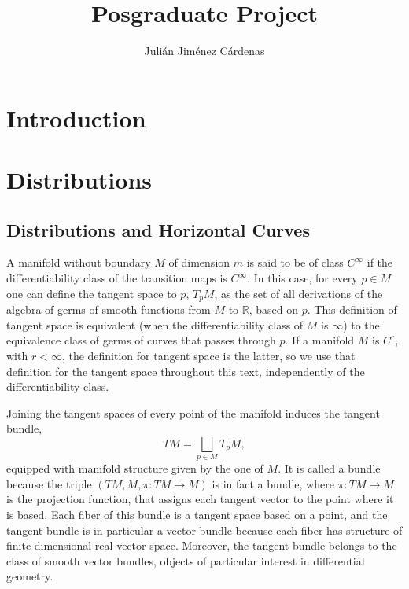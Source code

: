 \documentclass[12pt, letterpaper, reqno]{amsart}
\author{Julián Jiménez Cárdenas}
\title[Posgraduate Project]{Posgraduate Project}
\theoremstyle{definition}
\theoremstyle{plain}
\theoremstyle{remark}
\begin{document}
\maketitle
\begin{abstract}
\end{abstract}

\section*{Introduction}
\label{sec:0}


\section{Distributions}
\label{sec:1}

\subsection{Distributions and Horizontal Curves}%
\label{sub:distributions}


A manifold without boundary $M$ of dimension $ m $  is said to be of class $ C^\infty $ if the differentiability class of the transition maps is $C^\infty.$ In this case, for every $ p\in M $ one can define the tangent space to $ p $, $ T_pM $, as the set of all derivations of the algebra of germs of smooth functions from $ M $ to $ \mathbb{R}  $,  based on $ p $. This definition of tangent space is equivalent (when the differentiability class of $ M $ is $ \infty $) to the equivalence class of germs of curves that passes through $ p $. If a manifold $ M $  is $C^r$, with $r< \infty$, the definition for tangent space is the latter, so we use that definition for the tangent space throughout this text, independently of the differentiability class.

Joining the tangent spaces of every point of the manifold induces the tangent bundle,
$$ TM = \bigsqcup_{p\in M} T_pM, $$ 
equipped with manifold structure given by the one of $ M. $ It is called a bundle because the triple $ (TM, M,\pi:TM \rightarrow {M}) $ is in fact a bundle, where $ \pi:TM \rightarrow {M} $  is the projection function, that assigns each tangent vector to the point where it is based. Each fiber of this bundle is a tangent space based on a point, and the tangent bundle is in particular a vector bundle because each fiber has structure of finite dimensional real vector space. Moreover, the tangent bundle belongs to the class of smooth vector bundles, objects of particular interest in differential geometry.
\end{document}
